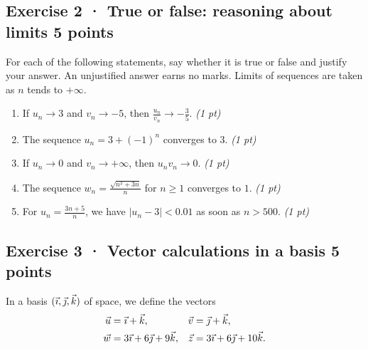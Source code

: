 \subsection*{Exercise 2 · True or false: reasoning about limits \hfill 5 points}For each of the following statements, say whether it is true or false and justify your answer. An unjustified answer earns no marks. Limits of sequences are taken as $n$ tends to $+\infty$.

\begin{enumerate}

\item If $u_n\to 3$ and $v_n\to-5$, then $\frac{u_n}{v_n}\to-\frac{3}{5}$. \hfill\textit{(1 pt)}

\item The sequence $u_n=3+(-1)^n$ converges to $3$. \hfill\textit{(1 pt)}

\item If $u_n\to0$ and $v_n\to+\infty$, then $u_nv_n\to0$. \hfill\textit{(1 pt)}

\item The sequence $w_n=\frac{\sqrt{n^2+3n}}{n}$ for $n\ge1$ converges to $1$. \hfill\textit{(1 pt)}

\item For $u_n=\frac{3n+5}{n}$, we have $|u_n-3|<0.01$ as soon as $n> 500$. \hfill\textit{(1 pt)}

\end{enumerate}

\clearpage{}\par

\subsection*{Exercise 3 · Vector calculations in a basis \hfill 5 points}In a basis $(\vec{\imath},\vec{\jmath},\vec k)$ of space, we define the vectors
\[\begin{aligned}\vec u&=\vec{\imath}+\vec k,&\vec v&=\vec{\jmath}+\vec k,\\
\vec w&=3\vec{\imath}+6\vec{\jmath}+9\vec k,&\vec z&=3\vec{\imath}+6\vec{\jmath}+10\vec k.\end{aligned}\]

